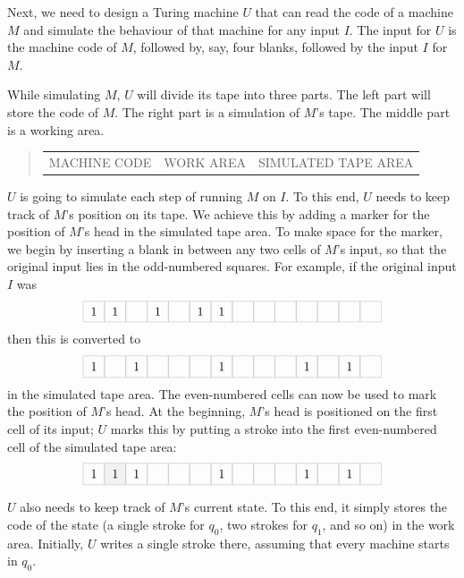 
Next,
we need to design a Turing machine $U$ that
can read the code of a machine $M$ and
simulate the behaviour of that machine for any input $I$.
The input for $U$ is
the machine code of $M$,
followed by, say, four blanks,
followed by the input $I$ for $M$.

While simulating $M$,
$U$ will divide its tape into three parts.
The left part will store the code of $M$.
The right part is a simulation of $M$'s tape.
The middle part is a working area.

\begin{quote}
  \centering
  \begin{tabular}{ccc}
    \cellcolor{gray!10} MACHINE CODE & \cellcolor{gray!10} WORK AREA & \cellcolor{gray!10} SIMULATED TAPE AREA
  \end{tabular}
\end{quote}

$U$ is going to simulate each step of running $M$ on $I$.
To this end,
$U$ needs to keep track of
$M$'s position on its tape.
We achieve this by adding a marker for the position of $M$'s head in the simulated tape area.
To make space for the marker,
we begin by inserting a blank in between any two cells of $M$'s input,
so that the original input lies in the odd-numbered squares.
For example, if the original input $I$ was
\[
   \turingtape{{1,1, ,1, ,1,1, , , , , , , }}{100}
\]
then this is converted to
\[
  \turingtape{{1, ,1, , , ,1, , , ,1, ,1, }}{100}
\]
in the simulated tape area.
The even-numbered cells can now be used to mark the position of $M$'s head.
At the beginning,
$M$'s head is positioned on the first cell of its input;
$U$ marks this by putting a stroke into the first even-numbered cell of the simulated tape area:
\[
  \turingtape{{1,1,1, , , ,1, , , ,1, ,1, }}{1}
\]

$U$ also needs to keep track of $M$'s current state.
To this end,
it simply stores the code of the state
(a single stroke for $q_0$, two strokes for $q_1$, and so on)
in the work area.
Initially,
$U$ writes a single stroke there,
assuming that every machine starts in $q_{0}$.

